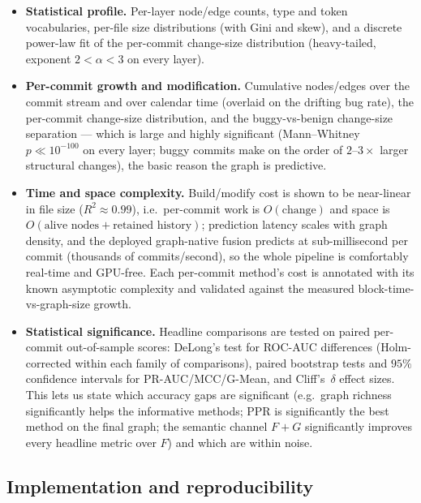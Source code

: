 	\begin{itemize}
		\item \textbf{Statistical profile.} Per-layer node/edge counts, type and token
		vocabularies, per-file size distributions (with Gini and skew), and a discrete
		power-law fit of the per-commit change-size distribution (heavy-tailed, exponent
		$2<\alpha<3$ on every layer).
		\item \textbf{Per-commit growth and modification.} Cumulative nodes/edges over the
		commit stream and over calendar time (overlaid on the drifting bug rate), the
		per-commit change-size distribution, and the buggy-vs-benign change-size separation
		--- which is large and highly significant (Mann--Whitney $p\ll 10^{-100}$ on every
		layer; buggy commits make on the order of $2$--$3\times$ larger structural changes),
		the basic reason the graph is predictive.
		\item \textbf{Time and space complexity.} Build/modify cost is shown to be near-linear
		in file size ($R^2\approx0.99$), i.e.\ per-commit work is $O(\text{change})$ and space
		is $O(\text{alive nodes}+\text{retained history})$; prediction latency scales with
		graph density, and the deployed graph-native fusion predicts at sub-millisecond per
		commit (thousands of commits/second), so the whole pipeline is comfortably real-time
		and GPU-free. Each per-commit method's cost is annotated with its known asymptotic
		complexity and validated against the measured block-time-vs-graph-size growth.
		\item \textbf{Statistical significance.} Headline comparisons are tested on paired
		per-commit out-of-sample scores: DeLong's test for ROC-AUC differences (Holm-corrected
		within each family of comparisons), paired bootstrap tests and $95\%$ confidence
		intervals for PR-AUC/MCC/G-Mean, and Cliff's~$\delta$ effect sizes. This lets us state
		which accuracy gaps are significant (e.g.\ graph richness significantly helps the
		informative methods; PPR is significantly the best method on the final graph; the
		semantic channel $F{+}G$ significantly improves every headline metric over $F$) and
		which are within noise.
	\end{itemize}
	
	\subsection{Implementation and reproducibility}
	\label{sec:setup-impl}
	

